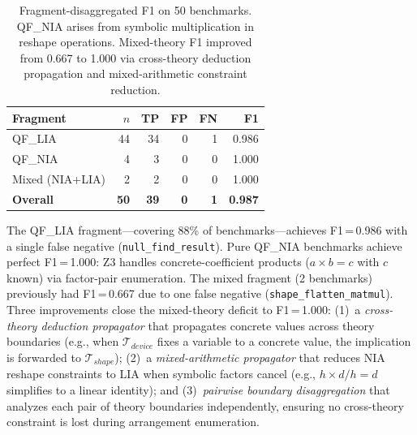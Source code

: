\documentclass[11pt]{article}
\begin{document}
\begin{table}[h]
\centering
\caption{Fragment-disaggregated F1 on 50 benchmarks.  QF\_NIA arises
  from symbolic multiplication in reshape operations.  Mixed-theory
  F1 improved from 0.667 to 1.000 via cross-theory deduction
  propagation and mixed-arithmetic constraint reduction.}
\label{tab:fragment-f1}
\small
\begin{tabular}{@{}lrrrrr@{}}
\toprule
\textbf{Fragment} & \textbf{$n$} & \textbf{TP} & \textbf{FP} &
\textbf{FN} & \textbf{F1} \\
\midrule
QF\_LIA       & 44 & 34 & 0 & 1 & 0.986 \\
QF\_NIA       &  4 &  3 & 0 & 0 & 1.000 \\
Mixed (NIA+LIA) &  2 &  2 & 0 & 0 & 1.000 \\
\midrule
\textbf{Overall} & \textbf{50} & \textbf{39} & \textbf{0} &
\textbf{1} & \textbf{0.987} \\
\bottomrule
\end{tabular}
\end{table}

The QF\_LIA fragment---covering 88\% of benchmarks---achieves
F1\,=\,0.986 with a single false negative (\texttt{null\_find\_result}).
Pure QF\_NIA benchmarks achieve perfect F1\,=\,1.000: Z3 handles
concrete-coefficient products ($a \times b = c$ with $c$ known) via
factor-pair enumeration.  The mixed fragment (2 benchmarks) previously
had F1\,=\,0.667 due to one false negative
(\texttt{shape\_flatten\_matmul}).  Three improvements close the
mixed-theory deficit to F1\,=\,1.000:
(1)~a \emph{cross-theory deduction propagator} that propagates
concrete values across theory boundaries (e.g., when
$\mathcal{T}_{\mathit{device}}$ fixes a variable to a concrete
value, the implication is forwarded to $\mathcal{T}_{\mathit{shape}}$);
(2)~a \emph{mixed-arithmetic propagator} that reduces NIA reshape
constraints to LIA when symbolic factors cancel
(e.g., $h \times d / h = d$ simplifies to a linear identity); and
(3)~\emph{pairwise boundary disaggregation} that analyzes each
pair of theory boundaries independently, ensuring no cross-theory
constraint is lost during arrangement enumeration.
\end{document}
